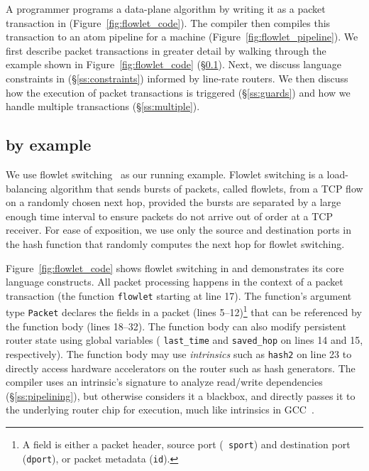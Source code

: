 A programmer programs a data-plane algorithm by writing it as a packet
transaction in \pktlanguage (Figure~\ref{fig:flowlet_code}).  The \pktlanguage
compiler then compiles this transaction to an atom pipeline for a \absmachine
machine (Figure~\ref{fig:flowlet_pipeline}). We first describe packet
transactions in greater detail by walking through the example shown in
Figure~\ref{fig:flowlet_code} (\S\ref{ss:flowlet}). Next, we discuss language
constraints in \pktlanguage (\S\ref{ss:constraints}) informed by line-rate
routers.  We then discuss how the execution of packet transactions is triggered
(\S\ref{ss:guards}) and how we handle multiple transactions
(\S\ref{ss:multiple}).

\subsection{\pktlanguage by example}
\label{ss:flowlet}

We use flowlet switching~\cite{flowlets} as our running example. Flowlet
switching is a load-balancing algorithm that sends bursts of packets, called
flowlets, from a TCP flow on a randomly chosen next hop, provided the bursts
are separated by a large enough time interval to ensure packets do not arrive
out of order at a TCP receiver. For ease of exposition, we use only the source
and destination ports in the hash function that randomly computes the next hop
for flowlet switching.

Figure~\ref{fig:flowlet_code} shows flowlet switching in \pktlanguage and
demonstrates its core language constructs. All packet processing happens in the
context of a packet transaction (the function \texttt{flowlet} starting at line
17). The function's argument type {\tt Packet} declares the fields in a packet
(lines 5--12)\footnote{A field is either a packet header, \eg source port ({\tt
sport}) and destination port ({\tt dport}), or packet metadata ({\tt id}).}
that can be referenced by the function body (lines 18--32).  The function body
can also modify persistent router state using global variables (\eg
\texttt{last\_time} and \texttt{saved\_hop} on lines 14 and 15, respectively).
The function body may use \textit{intrinsics} such as \texttt{hash2} on line 23
to directly access hardware accelerators on the router such as hash generators.
The \pktlanguage compiler uses an intrinsic's signature to analyze read/write
dependencies (\S\ref{ss:pipelining}), but otherwise considers it a blackbox,
and directly passes it to the underlying router chip for execution, much like
intrinsics in GCC~\cite{intrinsics}.

